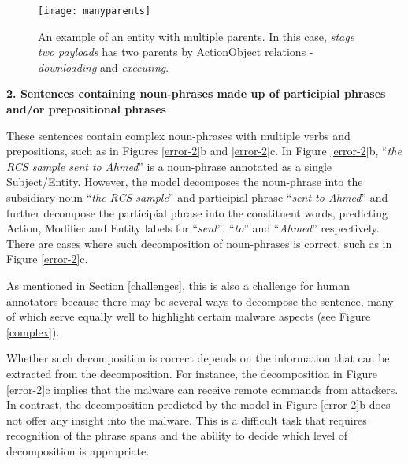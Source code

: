 \documentclass[11pt,a4paper]{article}
\begin{document}
\begin{figure*}[t]
\centering
\texttt{[image: manyparents]}
\vspace{-2mm}
\caption{\label{manyparents}
An example of an entity with multiple parents. In this case, \emph{stage two payloads} has two parents by ActionObject relations - \emph{downloading} and \emph{executing}.
}
\end{figure*}

\textbf{2. Sentences containing noun-phrases made up of participial phrases and/or prepositional phrases}

\label{complex_reper}

These sentences contain complex noun-phrases with multiple verbs and prepositions, such as in Figures \ref{error-2}b and \ref{error-2}c. In Figure \ref{error-2}b, ``\emph{the RCS sample sent to Ahmed}'' is a noun-phrase annotated as a single Subject/Entity. However, the model decomposes the noun-phrase into the subsidiary noun ``\emph{the RCS sample}'' and participial phrase ``\emph{sent to Ahmed}'' and further decompose the participial phrase into the constituent words, predicting Action, Modifier and Entity labels for ``\emph{sent}'', ``\emph{to}'' and ``\emph{Ahmed}'' respectively. There are cases where such decomposition of noun-phrases is correct, such as in Figure \ref{error-2}c. 

As mentioned in Section \ref{challenges}, this is also a challenge for human annotators because there may be several ways to decompose the sentence, many of which serve equally well to highlight certain malware aspects (see Figure \ref{complex}).

Whether such decomposition is correct depends on the information that can be extracted from the decomposition. For instance, the decomposition in Figure \ref{error-2}c implies that the malware can receive remote commands from attackers. In contrast, the decomposition predicted by the model in Figure \ref{error-2}b does not offer any insight into the malware. This is a difficult task that requires recognition of the phrase spans and the ability to decide which level of decomposition is appropriate.
\end{document}

